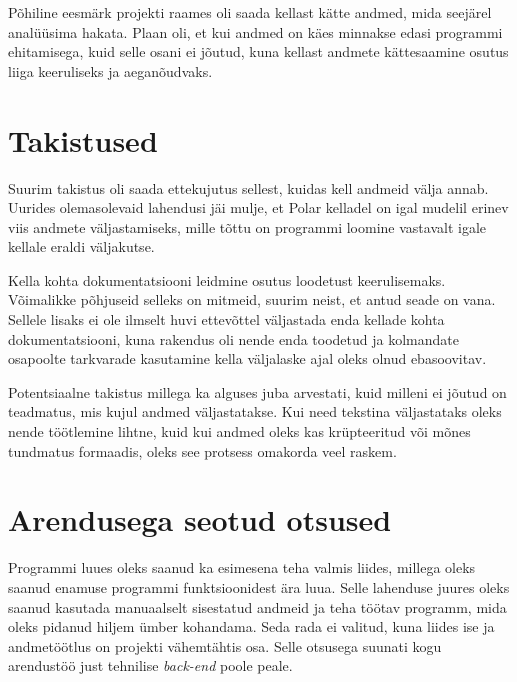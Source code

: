 Põhiline eesmärk projekti raames oli saada kellast kätte andmed, mida seejärel analüüsima hakata.
Plaan oli, et kui andmed on käes minnakse edasi programmi ehitamisega, kuid selle osani ei jõutud, kuna kellast andmete kättesaamine osutus liiga keeruliseks ja aeganõudvaks.

\section{Takistused}
Suurim takistus oli saada ettekujutus sellest, kuidas kell andmeid välja annab.
Uurides olemasolevaid lahendusi jäi mulje, et Polar kelladel on igal mudelil erinev viis andmete väljastamiseks, mille tõttu on programmi loomine vastavalt igale kellale eraldi väljakutse.\cite{flowlink-git}

Kella kohta dokumentatsiooni leidmine osutus loodetust keerulisemaks.
Võimalikke põhjuseid selleks on mitmeid, suurim neist, et antud seade on vana.
Sellele lisaks ei ole ilmselt huvi ettevõttel väljastada enda kellade kohta dokumentatsiooni, kuna rakendus oli nende enda toodetud ja kolmandate osapoolte tarkvarade kasutamine kella väljalaske ajal oleks olnud ebasoovitav.

Potentsiaalne takistus millega ka alguses juba arvestati, kuid milleni ei jõutud on teadmatus, mis kujul andmed väljastatakse.
Kui need tekstina väljastataks oleks nende töötlemine lihtne, kuid kui andmed oleks kas krüpteeritud või mõnes tundmatus formaadis, oleks see protsess omakorda veel raskem.

\section{Arendusega seotud otsused}
Programmi luues oleks saanud ka esimesena teha valmis liides, millega oleks saanud enamuse programmi funktsioonidest ära luua.
Selle lahenduse juures oleks saanud kasutada manuaalselt sisestatud andmeid ja teha töötav programm, mida oleks pidanud hiljem ümber kohandama.
Seda rada ei valitud, kuna liides ise ja andmetöötlus on projekti vähemtähtis osa.
Selle otsusega suunati kogu arendustöö just tehnilise \textit{back-end} poole peale.

